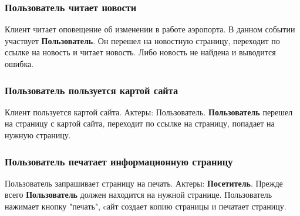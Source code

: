 \subsubsection{Пользователь читает новости}
Клиент читает оповещение об изменении в работе аэропорта.
В данном событии участвует \textbf{Пользователь}.
Он перешел на новостную страницу, переходит по ссылке на 
новость и читает новость. Либо новость не найдена и 
выводится ошибка.

\subsubsection{Пользователь пользуется картой сайта}
Клиент пользуется картой сайта. Актеры: Пользователь.
\textbf{Пользователь} перешел на страницу с картой сайта,
переходит по ссылке на страницу, попадает на нужную страницу.

\subsubsection{Пользователь печатает информационную страницу}
Пользователь запрашивает страницу на печать. Актеры: 
\textbf{Посетитель}. Прежде всего \textbf{Пользователь} 
должен находится на нужной странице. Пользователь нажимает 
кнопку "печать", cайт создает копию страницы и печатает 
страницу.
